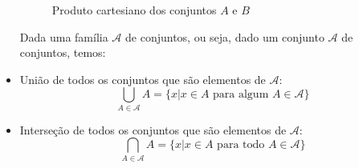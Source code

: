 \begin{itemize}
\begin{exem}
  \begin{figure}[H]
 \centering
    \caption{Produto cartesiano dos conjuntos $A$ e $B$}
  \end{figure}
  
 \end{exem}
 
 \vskip0.4cm
 
 \newpage
 
 Dada uma família $\mathcal{A}$ de conjuntos, ou seja, dado um conjunto $\mathcal{A}$ de conjuntos, temos:
 \item União de todos os conjuntos que são elementos de $\mathcal{A}$:
 $$\bigcup_{A \in \mathcal{A}} A = \{x| x \in A \text{ para algum } A \in \mathcal{A}\}$$
 \item Interseção de todos os conjuntos que são elementos de $\mathcal{A}$:
 $$\bigcap_{A \in \mathcal{A}} A = \{x| x \in A \text{ para todo } A \in \mathcal{A}\}$$
\end{itemize}

